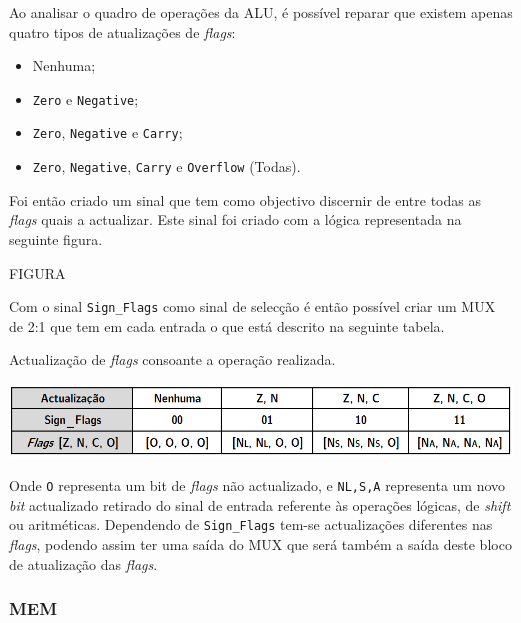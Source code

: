 \documentclass[11pt]{article}
\numberwithin{equation}{section}
\begin{document}
Ao analisar o quadro de operações da ALU, é possível reparar que existem apenas quatro tipos de atualizações de \textit{flags}:

\vspace{-2mm}

\begin{itemize}
  \item Nenhuma;
  \vspace{-2.5mm}
  \item \texttt{Zero} e \texttt{Negative};
  \vspace{-2.5mm}
  \item \texttt{Zero}, \texttt{Negative} e \texttt{Carry};
  \vspace{-2.5mm}
  \item \texttt{Zero}, \texttt{Negative}, \texttt{Carry} e \texttt{Overflow} (Todas).
\end{itemize}

Foi então criado um sinal que tem como objectivo discernir de entre todas as \textit{flags} quais a actualizar. Este sinal foi criado com a lógica representada na seguinte figura.

FIGURA

Com o sinal \texttt{Sign\_Flags} como sinal de selecção é então possível criar um MUX de 2:1 que tem em cada entrada o que está descrito na seguinte tabela.

\vspace{1.5mm}
\begin{table}[h]
	\centering
	\caption{Actualização de \textit{flags} consoante a operação realizada.}
	\vspace{-2mm}
 	\includegraphics[width=1\linewidth]{tabelas/tabelaFlags}
\end{table}

Onde \texttt{O} representa um bit de \textit{flags} não actualizado, e \texttt{N{\scriptsize {L,S,A}}} representa um novo \textit{bit} actualizado retirado do sinal de entrada referente às operações lógicas, de \textit{shift} ou aritméticas. Dependendo de \texttt{Sign\_Flags} tem-se actualizações diferentes nas \textit{flags}, podendo assim ter uma saída do MUX que será também a saída deste bloco de atualização das \textit{flags}.

\subsubsection{MEM}
\end{document}
